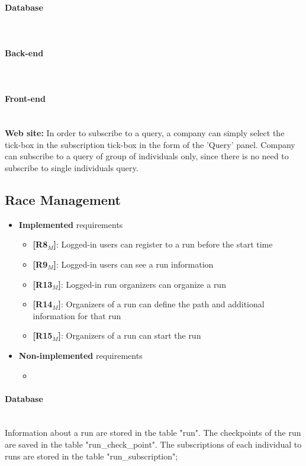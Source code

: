 \paragraph{Database} \mbox{}\\  \paragraph{Back-end} \mbox{}\\  \paragraph{Front-end} \mbox{}\\
\textbf{Web site:} In order to subscribe to a query, a company can simply select the tick-box in the subscription tick-box in the form of the 'Query' panel.
Company can subscribe to a query of group of individuals only, since there is no need to subscribe to single individuals query.

\subsection{Race Management}
\begin{itemize}
    \item \textbf{Implemented} requirements
        \begin{itemize}
    \item \textbf{[R8$_M$]}: Logged-in users can register to a run before the start time
    \item \textbf{[R9$_M$]}: Logged-in users can see a run information
    \item \textbf{[R13$_M$]}: Logged-in run organizers can organize a run
    \item \textbf{[R14$_M$]}: Organizers of a run can define the path and additional information for that run
    \item \textbf{[R15$_M$]}: Organizers of a run can start the run

        \end{itemize}
    \item \textbf{Non-implemented} requirements
    \begin{itemize}
            \item 
        \end{itemize}
\end{itemize}

\paragraph{Database} \mbox{}\\
Information about a run are stored in the table "run". The checkpoints of the run are saved in the table "run\_check\_point". The subscriptions of each individual to runs are stored in the table "run\_subscription";
